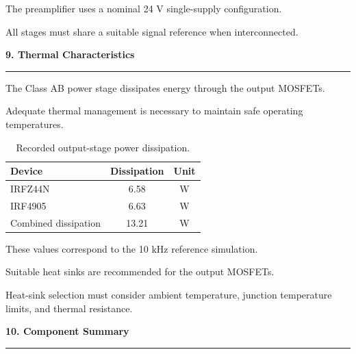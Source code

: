 \documentclass[10pt,letterpaper]{article}
\newcommand{\datasheetsection}[1]{
    \vspace{0.3cm}
    {\large\bfseries\color{datasheetblue}#1}
    \par\vspace{0.1cm}
    \hrule
    \vspace{0.15cm}
}
\begin{document}
The preamplifier uses a nominal
24 V single-supply configuration.

All stages must share a suitable
signal reference when interconnected.

\datasheetsection{9. Thermal Characteristics}

The Class AB power stage dissipates
energy through the output MOSFETs.

Adequate thermal management is
necessary to maintain safe
operating temperatures.

\begin{table}[htbp]
\centering

\begin{tabular}{p{7cm}cc}
\hline
Device & Dissipation & Unit\\
\hline

IRFZ44N & 6.58 & W\\

IRF4905 & 6.63 & W\\

Combined dissipation & 13.21 & W\\

\hline
\end{tabular}

\caption{Recorded output-stage power dissipation.}
\end{table}

These values correspond to the
10 kHz reference simulation.

Suitable heat sinks are recommended
for the output MOSFETs.

Heat-sink selection must consider
ambient temperature, junction
temperature limits, and
thermal resistance.

\datasheetsection{10. Component Summary}

\small
\end{document}
